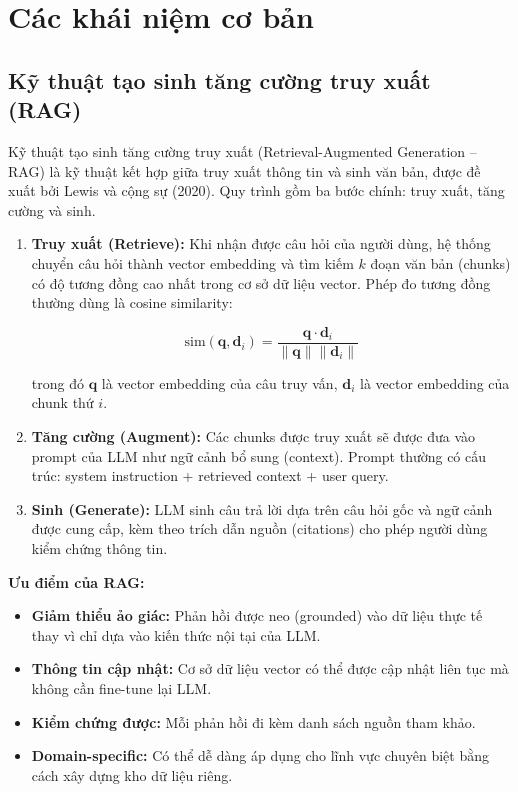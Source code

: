 \section{Các khái niệm cơ bản}

\subsection{Kỹ thuật tạo sinh tăng cường truy xuất (RAG)}

Kỹ thuật tạo sinh tăng cường truy xuất (Retrieval-Augmented Generation -- RAG) là kỹ thuật kết hợp giữa truy xuất thông tin và sinh văn bản, được đề xuất bởi Lewis và cộng sự (2020). Quy trình gồm ba bước chính: truy xuất, tăng cường và sinh.

\begin{enumerate}
    \item \textbf{Truy xuất (Retrieve):} Khi nhận được câu hỏi của người dùng, hệ thống chuyển câu hỏi thành vector embedding và tìm kiếm $k$ đoạn văn bản (chunks) có độ tương đồng cao nhất trong cơ sở dữ liệu vector. Phép đo tương đồng thường dùng là cosine similarity:

    \begin{equation}
        \text{sim}(\mathbf{q}, \mathbf{d}_i) = \frac{\mathbf{q} \cdot \mathbf{d}_i}{\|\mathbf{q}\| \|\mathbf{d}_i\|}
    \end{equation}

    trong đó $\mathbf{q}$ là vector embedding của câu truy vấn, $\mathbf{d}_i$ là vector embedding của chunk thứ $i$.

    \item \textbf{Tăng cường (Augment):} Các chunks được truy xuất sẽ được đưa vào prompt của LLM như ngữ cảnh bổ sung (context). Prompt thường có cấu trúc: system instruction + retrieved context + user query.

    \item \textbf{Sinh (Generate):} LLM sinh câu trả lời dựa trên câu hỏi gốc và ngữ cảnh được cung cấp, kèm theo trích dẫn nguồn (citations) cho phép người dùng kiểm chứng thông tin.
\end{enumerate}

\textbf{Ưu điểm của RAG:}

\begin{itemize}
    \item \textbf{Giảm thiểu ảo giác:} Phản hồi được neo (grounded) vào dữ liệu thực tế thay vì chỉ dựa vào kiến thức nội tại của LLM.
    \item \textbf{Thông tin cập nhật:} Cơ sở dữ liệu vector có thể được cập nhật liên tục mà không cần fine-tune lại LLM.
    \item \textbf{Kiểm chứng được:} Mỗi phản hồi đi kèm danh sách nguồn tham khảo.
    \item \textbf{Domain-specific:} Có thể dễ dàng áp dụng cho lĩnh vực chuyên biệt bằng cách xây dựng kho dữ liệu riêng.
\end{itemize}

